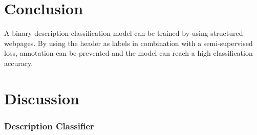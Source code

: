 \documentclass[a4paper, 12pt, oneside]{book} %
\begin{document}
\section{Conclusion} \label{par:conclusion}
A binary description classification model can be trained by using structured webpages. 
By using the header as labels in combination with a semi-supervised loss, annotation can be prevented and the model can reach a high classification accuracy.

\section{Discussion} \label{par:discussion}
\subsubsection{Description Classifier}



\printbibliography
\end{document}
